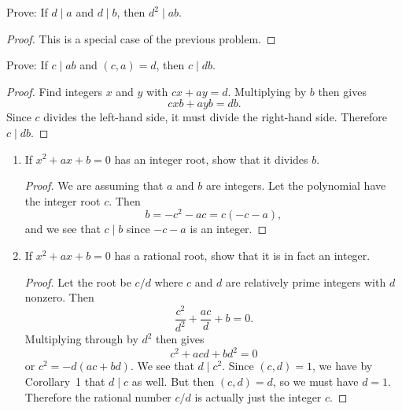  Prove: If $d\mid a$ and $d\mid b$, then $d^2\mid ab$.
\begin{proof}
  This is a special case of the previous problem.
\end{proof}

 Prove: If $c\mid ab$ and $(c,a) = d$, then $c\mid db$.
\begin{proof}
  Find integers $x$ and $y$ with $cx + ay = d$. Multiplying by $b$
  then gives
  \begin{equation*}
    cxb + ayb = db.
  \end{equation*}
  Since $c$ divides the left-hand side, it must divide the right-hand
  side. Therefore $c\mid db$.
\end{proof}

\begin{enumerate}
\item If $x^2 + ax + b = 0$ has an integer root, show that it divides
  $b$.
  \begin{proof}
    We are assuming that $a$ and $b$ are integers. Let the polynomial
    have the integer root $c$. Then
    \begin{equation*}
      b = -c^2 - ac = c(-c - a),
    \end{equation*}
    and we see that $c\mid b$ since $-c - a$ is an integer.
  \end{proof}
\item If $x^2 + ax + b = 0$ has a rational root, show that it is in
  fact an integer.
  \begin{proof}
    Let the root be $c/d$ where $c$ and $d$ are relatively prime
    integers with $d$ nonzero. Then
    \begin{equation*}
      \frac{c^2}{d^2} + \frac{ac}d + b = 0.
    \end{equation*}
    Multiplying through by $d^2$ then gives
    \begin{equation*}
      c^2 + acd + bd^2 = 0
    \end{equation*}
    or $c^2 = -d(ac + bd)$. We see that $d\mid c^2$. Since
    $(c,d) = 1$, we have by Corollary~1 that $d\mid c$ as well. But
    then $(c,d) = d$, so we must have $d = 1$. Therefore the rational
    number $c/d$ is actually just the integer $c$.
  \end{proof}
\end{enumerate}

